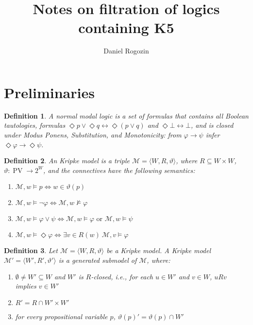 \documentclass[a4paper]{article}
\author{Daniel Rogozin}
\date{}
\title{Notes on filtration of logics containing {\bf K5}}
\theoremstyle{defin}
\newtheorem{defin}{Definition}
\theoremstyle{theorem}
\theoremstyle{prop}
\theoremstyle{lemma}
\theoremstyle{fact}
\theoremstyle{ex}
\theoremstyle{col}
\begin{document}
\maketitle

\section{Preliminaries}

\begin{defin}
  A normal modal logic is a set of formulas that contains all Boolean tautologies,
  formulas $\Diamond p \lor \Diamond q \leftrightarrow \Diamond (p \lor q)$ and
  $\Diamond \bot \leftrightarrow \bot$, and is closed under Modus Ponens, Substitution, and
  Monotonicity:
  from $\varphi \rightarrow \psi$ infer $\Diamond \varphi \rightarrow \Diamond \psi$.
\end{defin}

\begin{defin} An Kripke model is a triple $\mathcal{M} = \langle W, R, \vartheta \rangle$,
  where $R \subseteq W \times W$, $\vartheta : \operatorname{PV} \to 2^W$, and
  the connectives have the following semantics:

  \begin{enumerate}
    \item $\mathcal{M}, w \models p \Leftrightarrow w \in \vartheta(p)$
    \item $\mathcal{M}, w \models \neg \varphi \Leftrightarrow \mathcal{M}, w \nvDash \varphi$
    \item $\mathcal{M}, w \models \varphi \lor \psi \Leftrightarrow \mathcal{M}, w \models \varphi \text{ or } \mathcal{M}, w \models \psi$
    \item $\mathcal{M}, w \models \Diamond \varphi \Leftrightarrow \exists v \in R(w) \: \mathcal{M}, v \models \varphi$
  \end{enumerate}
\end{defin}

\begin{defin}
  Let $\mathcal{M} = \langle W, R, \vartheta \rangle$ be a Kripke model.
  A Kripke model $\mathcal{M}' = \langle W', R', \vartheta' \rangle$ is a generated submodel of
  $\mathcal{M}$, where:
  \begin{enumerate}
    \item $\emptyset \neq W' \subseteq W$ and $W'$ is $R$-closed, i.e., for each $u \in W'$ and $v \in W$,
    $u R v$ implies $v \in W'$
    \item $R' = R \cap W' \times W'$
    \item for every propositional variable $p$, $\vartheta(p)' = \vartheta(p) \cap W'$
  \end{enumerate}
\end{defin}
\end{document}
